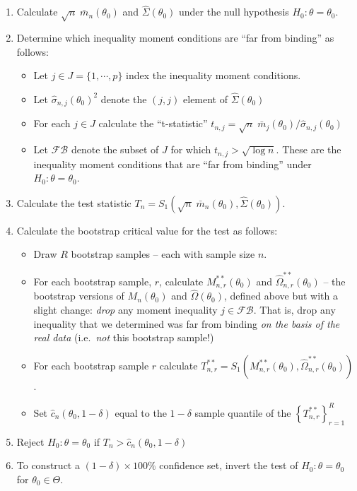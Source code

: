 \documentclass[12pt]{article}
\begin{document}
\begin{enumerate}
  \item Calculate $\sqrt{n}\; \bar{m}_n\left( \theta_0 \right)$ and $\widehat{\Sigma}(\theta_0)$ under the null hypothesis $H_0\colon \theta = \theta_0$.
  \item Determine which inequality moment conditions are ``far from binding'' as follows:
    \begin{itemize}
      \item Let $j \in J = \{ 1, \cdots, p\}$ index the inequality moment conditions.
      \item Let $\widehat{\sigma}_{n,j}(\theta_0)^2$ denote the $(j,j)$ element of $\widehat{\Sigma}(\theta_0)$
      \item For each $j\in J$ calculate the ``t-statistic'' $ t_{n,j} = \sqrt{n}\; \bar{m}_j(\theta_0)/\widehat{\sigma}_{n,j}(\theta_0)$
      \item Let $\mathcal{FB}$ denote the subset of $J$ for which $t_{n,j} >\sqrt{\log n}$.
        These are the inequality moment conditions that are ``far from binding'' under $H_0\colon\theta = \theta_0$. 
    \end{itemize}
  \item Calculate the test statistic $T_n = S_1\left(\sqrt{n}\; \bar{m}_n\left( \theta_0 \right), \widehat{\Sigma}\left( \theta_0 \right)  \right)$.
  \item Calculate the bootstrap critical value for the test as follows:
    \begin{itemize}
      \item Draw $R$ bootstrap samples -- each with sample size $n$. 
      \item For each bootstrap sample, $r$, calculate $M^{**}_{n,r}(\theta_0)$ and $\widehat{\Omega}^{**}_{n,r}(\theta_0)$ -- the bootstrap versions of $M_n(\theta_0)$ and $\widehat{\Omega}(\theta_0)$, defined above but with a slight change: \emph{drop} any moment inequality $j \in \mathcal{FB}$.
        That is, drop any inequality that we determined was far from binding \emph{on the basis of the real data} (i.e.\ \emph{not} this bootstrap sample!)
      \item For each bootstrap sample $r$ calculate $T_{n,r}^{**} = S_1\left(M^{**}_{n,r}\left( \theta_0 \right), \widehat{\Omega}^{**}_{n,r}\left( \theta_0 \right)  \right)$.
      \item Set $\widehat{c}_n(\theta_0, 1-\delta)$ equal to the $1-\delta$ sample quantile of the $\left\{ T_{n,r}^{**} \right\}_{r=1}^R$
    \end{itemize}
  \item Reject $H_0\colon \theta = \theta_0$ if $T_n > \widehat{c}_n(\theta_0, 1-\delta)$
  \item To construct a $(1 - \delta)\times 100\%$ confidence set, invert the test of $H_0\colon \theta = \theta_0$ for $\theta_0 \in \Theta$.
\end{enumerate}
\end{document}
